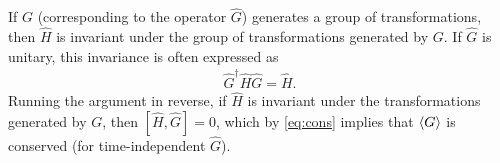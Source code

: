     If $G$ (corresponding to the operator $\hat{G}$) generates a group of transformations, then $\hat{H}$ is invariant under the group of transformations generated by $G$. If $\hat{G}$ is unitary, this invariance is often expressed as 
    \begin{align*}
        \hat{G}^\dagger\hat{H}\hat{G} = \hat{H}.
    \end{align*}
    Running the argument in reverse, if $\hat{H}$ is invariant under the transformations generated by $G$, then $[\hat{H},\hat{G}]=0$, which by \cref{eq:cons} implies that $\braket{G}$ is conserved (for time-independent $\hat{G}$).